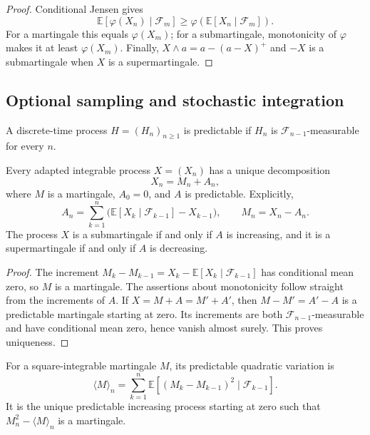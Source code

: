\begin{proof}
Conditional Jensen gives
\[
\mathbb E[\varphi(X_n)\mid\mathcal F_m]
 \geq\varphi(\mathbb E[X_n\mid\mathcal F_m]).
\]
For a martingale this equals $\varphi(X_m)$; for a submartingale, monotonicity
of $\varphi$ makes it at least $\varphi(X_m)$. Finally,
$X\wedge a=a-(a-X)^+$ and $-X$ is a submartingale when $X$ is a
supermartingale.
\end{proof}

\subsection{Optional sampling and stochastic integration}

\begin{de}
A discrete-time process $H=(H_n)_{n\geq1}$ is predictable if
$H_n$ is $\mathcal F_{n-1}$-measurable for every $n$.
\end{de}

\begin{thm}
Every adapted integrable process $X=(X_n)$ has a unique decomposition
\[
X_n=M_n+A_n,
\]
where $M$ is a martingale, $A_0=0$, and $A$ is predictable. Explicitly,
\[
A_n=\sum_{k=1}^{n}
 \bigl(\mathbb E[X_k\mid\mathcal F_{k-1}]-X_{k-1}\bigr),
\qquad
M_n=X_n-A_n.
\]
The process $X$ is a submartingale if and only if $A$ is increasing, and it
is a supermartingale if and only if $A$ is decreasing.
\end{thm}

\begin{proof}
The increment
$M_k-M_{k-1}=X_k-\mathbb E[X_k\mid\mathcal F_{k-1}]$ has conditional mean
zero, so $M$ is a martingale. The assertions about monotonicity follow
straight from the increments of $A$. If
$X=M+A=M'+A'$, then $M-M'=A'-A$ is a predictable martingale starting at zero.
Its increments are both $\mathcal F_{n-1}$-measurable and have conditional
mean zero, hence vanish almost surely. This proves uniqueness.
\end{proof}

\begin{de}
For a square-integrable martingale $M$, its predictable quadratic variation
is
\[
\langle M\rangle_n
 =\sum_{k=1}^{n}
   \mathbb E[(M_k-M_{k-1})^2\mid\mathcal F_{k-1}].
\]
It is the unique predictable increasing process starting at zero such that
$M_n^2-\langle M\rangle_n$ is a martingale.
\end{de}


